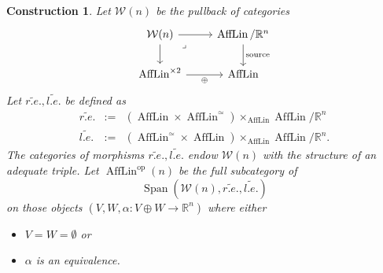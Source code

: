 \documentclass{article}
\newcommand{\R}{\mathbb{R}} %
\newcommand{\op}{\mathrm{op}}
\DeclareMathOperator{\AffLin}{AffLin}
\DeclareMathOperator{\Span}{Span}
\newtheorem{construction}{Construction}
\begin{document}
\begin{construction}
    Let $\mathcal W(n)$ be the pullback of categories 
    \[\begin{tikzcd}
        {\mathcal W(n)} & {\AffLin/\R^n} \\
        {\AffLin^{\times 2}} & \AffLin
        \arrow["{\mathrm{source}}", from=1-2, to=2-2]
        \arrow["\oplus"', from=2-1, to=2-2]
        \arrow[from=1-1, to=2-1]
        \arrow[from=1-1, to=1-2]
        \arrow["\lrcorner"{anchor=center, pos=0.125}, draw=none, from=1-1, to=2-2]
    \end{tikzcd}\]
    Let $\tilde{r.e.}, \tilde{l.e.}$ be defined as 
    \begin{eqnarray*} 
        \tilde{r.e.} & := & \left(\AffLin \times \AffLin^\simeq \right) \times_{\AffLin} \AffLin/\R^n \\
        \tilde{l.e.} & := & \left(\AffLin^\simeq \times \AffLin \right) \times_{\AffLin} \AffLin/\R^n.
    \end{eqnarray*}
    The categories of morphisms $\tilde{r.e.}, \tilde{l.e.}$ endow $\mathcal W(n)$ with the structure of 
    an adequate triple. 
    Let $\AffLin^\op(n)$ be the full subcategory of
    \[
        \Span(\mathcal W(n), \tilde{r.e.}, \tilde{l.e.}) 
    \]
    on those objects $(V,W, \alpha \colon  V \oplus W \to \R^n)$ where either 
    \begin{itemize}
        \item $V = W = \emptyset$ or 
        \item $\alpha$ is an equivalence.
    \end{itemize}


\end{construction}
\end{document}
